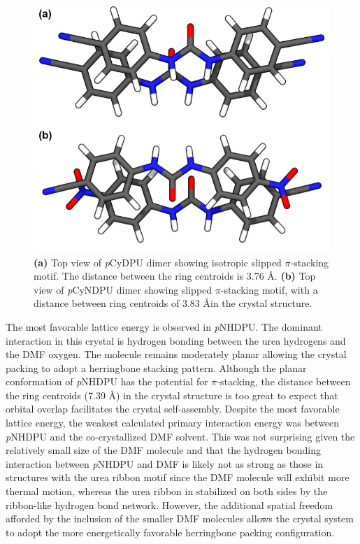 \begin{figure}[h!]
    \centering
    \includegraphics[width=0.8\linewidth]{figures/pub3/Picture5.jpg}
    \caption{\textbf{\textbf{(a)}} Top view of \textit{p}CyDPU dimer showing isotropic slipped $\pi$-stacking motif. The distance between the ring centroids is 3.76 \AA. \textbf{(b)} 	Top view of \textit{p}CyNDPU dimer showing slipped $\pi$-stacking motif, with a distance between ring centroids of 3.83 \AA in the crystal structure.}\label{fig:slip-stack}
\end{figure}

The most favorable lattice energy is observed in \textit{p}NHDPU. The dominant interaction in this crystal is hydrogen bonding between the urea hydrogens and the DMF oxygen. The molecule remains moderately planar allowing the crystal packing to adopt a herringbone stacking pattern. Although the planar conformation of \textit{p}NHDPU has the potential for $\pi$-stacking, the distance between the ring centroids (7.39 \AA) in the crystal structure is too great to expect that orbital overlap facilitates the crystal self-assembly. Despite the most favorable lattice energy, the weakest calculated primary interaction energy was between \textit{p}NHDPU and the co-crystallized DMF solvent. This was not surprising given the relatively small size of the DMF molecule and that the hydrogen bonding interaction between \textit{p}NHDPU and DMF is likely not as strong as those in structures with the urea ribbon motif since the DMF molecule will exhibit more thermal motion, whereas the urea ribbon in stabilized on both sides by the ribbon-like hydrogen bond network. However, the additional spatial freedom afforded by the inclusion of the smaller DMF molecules allows the crystal system to adopt the more energetically favorable herringbone packing configuration. 

